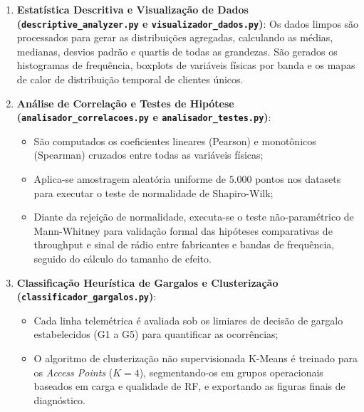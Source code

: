 \begin{enumerate}
    \begin{itemize}
        \item Remoção de instâncias corrompidas ou com identificadores físicos (MAC do AP ou Cliente) nulos;
        \item Conversão e unificação de escalas físicas (sinal recebido convertido e normalizado para dBm, throughput estimado convertido incrementalmente para Mbps);
        \item Anonimização criptográfica de privacidade dos MACs de clientes via algoritmo SHA-256, gerando hashes unidirecionais em conformidade com as diretrizes da LGPD;
        \item Mapeamento lógico de identificadores, convertendo MACs de gerência do Ruckus para etiquetas legíveis simplificadas (\texttt{RK-XXXX}) e associando os APs UniFi aos seus respectivos nomes físicos cadastrados.
    \end{itemize}
    Ao final desta fase, os datasets finais padronizados são persistidos em disco.
    \item \textbf{Estatística Descritiva e Visualização de Dados (\texttt{descriptive\_analyzer.py} e \texttt{visualizador\_dados.py})}:
    Os dados limpos são processados para gerar as distribuições agregadas, calculando as médias, medianas, desvios padrão e quartis de todas as grandezas. São gerados os histogramas de frequência, boxplots de variáveis físicas por banda e os mapas de calor de distribuição temporal de clientes únicos.
    \item \textbf{Análise de Correlação e Testes de Hipótese (\texttt{analisador\_correlacoes.py} e \texttt{analisador\_testes.py})}:
    \begin{itemize}
        \item São computados os coeficientes lineares (Pearson) e monotônicos (Spearman) cruzados entre todas as variáveis físicas;
        \item Aplica-se amostragem aleatória uniforme de $5.000$ pontos nos datasets para executar o teste de normalidade de Shapiro-Wilk;
        \item Diante da rejeição de normalidade, executa-se o teste não-paramétrico de Mann-Whitney para validação formal das hipóteses comparativas de throughput e sinal de rádio entre fabricantes e bandas de frequência, seguido do cálculo do tamanho de efeito.
    \end{itemize}
    \item \textbf{Classificação Heurística de Gargalos e Clusterização (\texttt{classificador\_gargalos.py})}:
    \begin{itemize}
        \item Cada linha telemétrica é avaliada sob os limiares de decisão de gargalo estabelecidos (G1 a G5) para quantificar as ocorrências;
        \item O algoritmo de clusterização não supervisionada K-Means é treinado para os \textit{Access Points} ($K=4$), segmentando-os em grupos operacionais baseados em carga e qualidade de RF, e exportando as figuras finais de diagnóstico.
    \end{itemize}
\end{enumerate}

